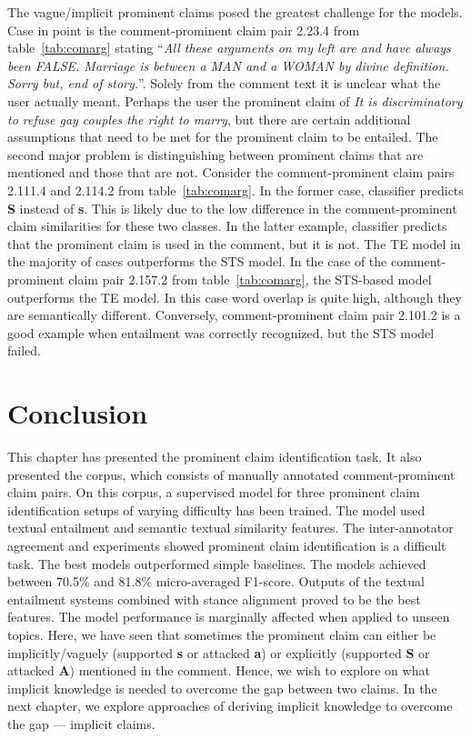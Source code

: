 The vague/implicit prominent claims posed the greatest challenge for the models. 
Case in point is the comment-prominent claim pair 2.23.4 from table~\ref{tab:comarg}  stating 
``\textit{All these arguments on my left are and have always been FALSE. Marriage is
between a MAN and a WOMAN by divine definition. Sorry but, end of story.}''.
Solely from the comment text it is unclear what the user actually meant. 
Perhaps the user  the prominent claim of 
\textit{ It is discriminatory to refuse gay couples the right to marry},
but there are certain additional assumptions that need to be met for the prominent claim 
to be entailed. 
The second major problem is distinguishing between prominent claims that are mentioned 
and those that are not. 
Consider the comment-prominent claim pairs 2.111.4 and 2.114.2 from table~\ref{tab:comarg}. 
In the former case, classifier predicts \textbf{S} instead of \textbf{s}. 
This is likely due to the low difference in the comment-prominent claim similarities for these
two classes. 
In the latter example, classifier predicts that the prominent claim is used in the comment, but
it is not. 
The TE model in the majority of cases outperforms the STS model. 
In the case of the comment-prominent claim pair 2.157.2 from table~\ref{tab:comarg}, the STS-based
model outperforms the TE model. 
In this case word overlap is quite high, although they are semantically different. 
Conversely, comment-prominent claim pair 2.101.2 is a good example when
entailment was correctly recognized, 
but the STS model failed. 


\section{Conclusion}
\label{sec:argrec_conclusion}

This chapter has presented the prominent claim identification task. 
It also presented the \ComArg corpus, which consists of manually annotated
comment-prominent claim pairs. 
On this corpus, a supervised model for three prominent claim identification 
setups of varying difficulty has been trained. 
The model used textual entailment and semantic textual similarity features. 
The inter-annotator agreement  and experiments showed prominent claim identification
is a difficult task. 
The best models outperformed simple baselines. 
The models achieved between 70.5\% and 81.8\% micro-averaged F1-score. 
Outputs of the textual entailment systems combined with stance alignment proved
to be the best features.
The model performance is marginally affected when applied to unseen topics. 
Here, we have seen that sometimes the prominent claim can either be implicitly/vaguely 
(supported \textbf{s} or attacked \textbf{a}) or explicitly (supported \textbf{S} or attacked
\textbf{A}) mentioned in the comment. Hence, we wish to explore on what implicit knowledge is
needed to overcome the gap between two claims. 
In the next chapter, we explore approaches of deriving implicit knowledge to overcome
the gap --- implicit claims. 
